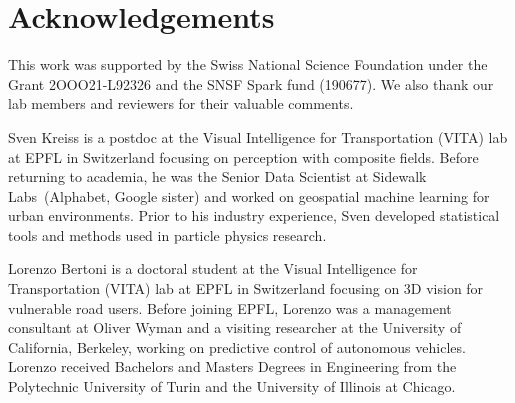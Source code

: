 \documentclass[journal]{IEEEtran}
\begin{document}
\section{Acknowledgements}

This work was supported by the Swiss National Science Foundation under the Grant 2OOO21-L92326 and the SNSF Spark fund (190677). We also thank our lab members and reviewers for their valuable comments.






























\ifCLASSOPTIONcaptionsoff
  \newpage
\fi

















\begin{IEEEbiography}{Sven Kreiss}
  is a postdoc at the Visual Intelligence for Transportation (VITA) lab
  at EPFL in Switzerland focusing on perception with composite fields.
  Before returning to academia, he was the Senior Data Scientist at Sidewalk
  Labs~(Alphabet, Google sister) and worked on geospatial machine learning
  for urban environments. Prior to his industry experience, Sven developed
  statistical tools and methods used in particle physics research.
\end{IEEEbiography}

\begin{IEEEbiography}{Lorenzo Bertoni}
  is a doctoral student at the Visual Intelligence for Transportation (VITA)
  lab at EPFL in Switzerland focusing on 3D vision for vulnerable road users.
  Before joining EPFL, Lorenzo was a management consultant at Oliver Wyman
  and a visiting researcher at the University of California, Berkeley,
  working on predictive control of autonomous vehicles. Lorenzo received
  Bachelors and Masters Degrees in Engineering from the Polytechnic
  University of Turin and the University of Illinois at Chicago.
\end{IEEEbiography}
\end{document}
